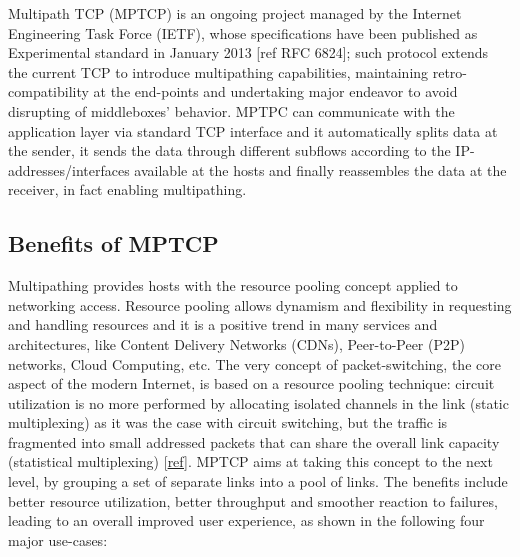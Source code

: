 Multipath TCP (MPTCP) is an ongoing project managed by the Internet Engineering Task Force (IETF), whose specifications have been published as Experimental standard in January 2013 [ref RFC 6824]; such protocol extends the current TCP to introduce multipathing capabilities, maintaining retro-compatibility at the end-points and undertaking major endeavor to avoid disrupting of middleboxes' behavior. MPTPC can communicate with the application layer via standard TCP interface and it automatically splits data at the sender, it sends the data through different subflows according to the IP-addresses/interfaces available at the hosts and finally reassembles the data at the receiver, in fact enabling multipathing.

\subsection{Benefits of MPTCP}
Multipathing provides hosts with the resource pooling concept applied to networking access. Resource pooling allows dynamism and flexibility in requesting and handling resources and it is a positive trend in many services and architectures, like Content Delivery Networks (CDNs), Peer-to-Peer (P2P) networks, Cloud Computing, etc. The very concept of packet-switching, the core aspect of the modern Internet, is based on a resource pooling technique: circuit utilization is no more performed by allocating isolated channels in the link (static multiplexing) as it was the case with circuit switching, but the traffic is fragmented into small addressed packets that can share the overall link capacity (statistical multiplexing) [\href{https://www.cl.cam.ac.uk/~as2330/docs/multipath-survey.pdf}{ref}]. MPTCP aims at taking this concept to the next level, by grouping a set of separate links into a pool of links. The benefits include better resource utilization, better throughput and smoother reaction to failures, leading to an overall improved user experience, as shown in the following four major use-cases:
